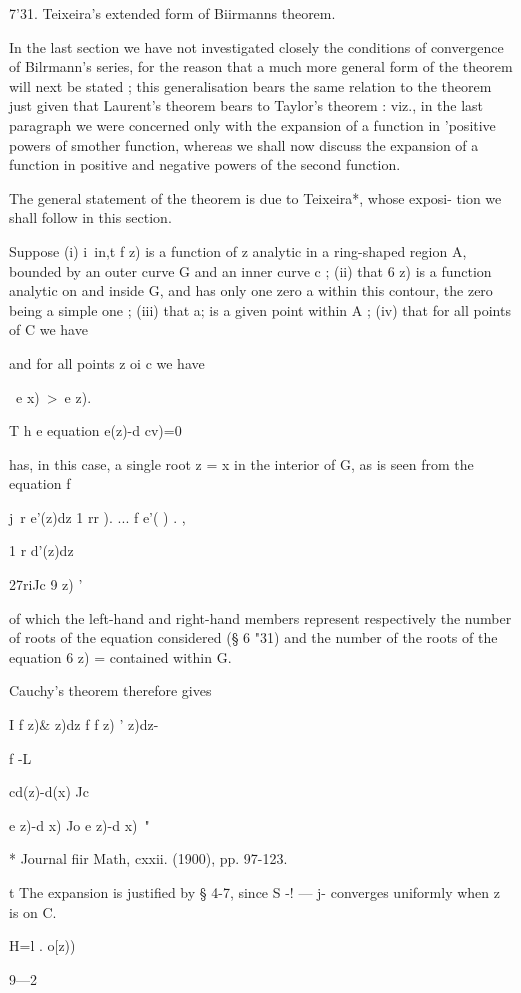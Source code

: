 7'31. Teixeira's extended form of Biirmanns theorem.

In the last section we have not investigated closely the conditions of
convergence of Bilrmann's series, for the reason that a much more
general form of the theorem will next be stated ; this generalisation
bears the same relation to the theorem just given that Laurent's
theorem bears to Taylor's theorem : viz., in the last paragraph we
were concerned only with the expansion of a function in 'positive
powers of smother function, whereas we shall now discuss the expansion
of a function in positive and negative powers of the second function.

The general statement of the theorem is due to Teixeira*, whose
exposi- tion we shall follow in this section.

Suppose (i) i\ in,t f z) is a function of z analytic in a ring-shaped
region A, bounded by an outer curve G and an inner curve c ; (ii) that
6 z) is a function analytic on and inside G, and has only one zero a
within this contour, the zero being a simple one ; (iii) that a; is a
given point within A ; (iv) that for all points of C we have

and for all points z oi c we have

\ e x)\ >\ e z).

T h e equation e(z)-d cv)=0

has, in this case, a single root z = x in the interior of G, as is
seen from the equation f

j\ r e'(z)dz 1 rr ). ... f e'( ) . ,

1 r d'(z)dz

27riJc 9 z) '

of which the left-hand and right-hand members represent respectively
the number of roots of the equation considered (§ 6 "31) and the
number of the roots of the equation 6 z) = contained within G.

Cauchy's theorem therefore gives

I f z)\& z)dz f f z) ' z)dz-

f -L

 cd(z)-d(x) Jc

e z)-d x) Jo e z)-d x)\ "

* Journal fiir Math, cxxii. (1900), pp. 97-123.

t The expansion is justified by § 4-7, since S -! — j- converges
uniformly when z is on C.

H=l . o[z))

9—2

